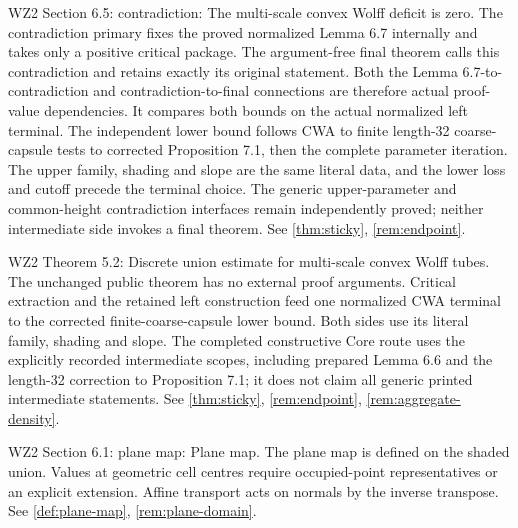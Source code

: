 \begin{remark}
\label{rem:atlas-W2Zero}
WZ2 Section 6.5: contradiction: The multi-scale convex Wolff deficit is zero.
The contradiction primary fixes the proved normalized Lemma 6.7 internally and takes only a positive critical package. The argument-free final theorem calls this contradiction and retains exactly its original statement. Both the Lemma 6.7-to-contradiction and contradiction-to-final connections are therefore actual proof-value dependencies. It compares both bounds on the actual normalized left terminal. The independent lower bound follows CWA to finite length-32 coarse-capsule tests to corrected Proposition 7.1, then the complete parameter iteration. The upper family, shading and slope are the same literal data, and the lower loss and cutoff precede the terminal choice. The generic upper-parameter and common-height contradiction interfaces remain independently proved; neither intermediate side invokes a final theorem.
See \ref{thm:sticky}, \ref{rem:endpoint}.
\end{remark}

\begin{remark}
\label{rem:atlas-W2T5_2}
WZ2 Theorem 5.2: Discrete union estimate for multi-scale convex Wolff tubes.
The unchanged public theorem has no external proof arguments. Critical extraction and the retained left construction feed one normalized CWA terminal to the corrected finite-coarse-capsule lower bound. Both sides use its literal family, shading and slope. The completed constructive Core route uses the explicitly recorded intermediate scopes, including prepared Lemma 6.6 and the length-32 correction to Proposition 7.1; it does not claim all generic printed intermediate statements.
See \ref{thm:sticky}, \ref{rem:endpoint}, \ref{rem:aggregate-density}.
\end{remark}

\begin{remark}
\label{rem:atlas-Dplane}
WZ2 Section 6.1: plane map: Plane map.
The plane map is defined on the shaded union. Values at geometric cell centres require occupied-point representatives or an explicit extension. Affine transport acts on normals by the inverse transpose.
See \ref{def:plane-map}, \ref{rem:plane-domain}.
\end{remark}


